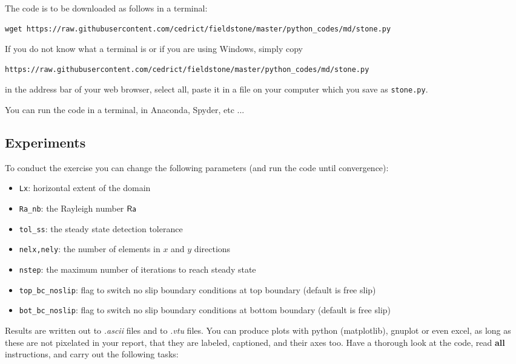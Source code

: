 The code is to be downloaded as follows in a terminal:
{\small
\begin{verbatim}
wget https://raw.githubusercontent.com/cedrict/fieldstone/master/python_codes/md/stone.py
\end{verbatim}
}
If you do not know what a terminal is or if you are using Windows, simply copy 
{\small
\begin{verbatim}
https://raw.githubusercontent.com/cedrict/fieldstone/master/python_codes/md/stone.py
\end{verbatim}
}
in the address bar of your web browser, select all, paste it in a file on your computer which 
you save as {\tt stone.py}.

You can run the code in a terminal, in Anaconda, Spyder, etc ... 

\subsection{Experiments}

To conduct the exercise you can change the following parameters (and run the code until convergence):
\begin{itemize}
\item {\tt Lx}: horizontal extent of the domain
\item {\tt Ra\_nb}: the Rayleigh number ${\mathsf{Ra}}$
\item {\tt tol\_ss}: the steady state detection tolerance
\item {\tt nelx,nely}: the number of elements in $x$ and $y$ directions 
\item {\tt nstep}: the maximum number of iterations to reach steady state
\item {\tt top\_bc\_noslip}: flag to switch no slip boundary conditions at top boundary (default is free slip)
\item {\tt bot\_bc\_noslip}: flag to switch no slip boundary conditions at 
      bottom boundary (default is free slip)
\end{itemize}

Results are written out to {\sl .ascii} files and to {\sl .vtu} files. You can produce 
plots with python (matplotlib), gnuplot or even excel, as long as these are not pixelated in your report, 
that they are labeled, captioned, and their axes too.  
Have a thorough look at the code, read {\bf all} instructions, and carry out the following tasks:


